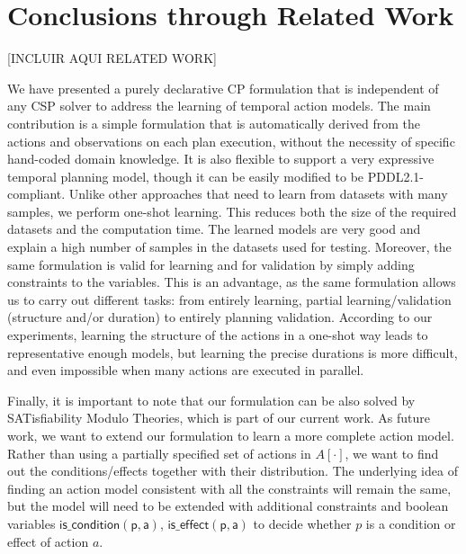 \documentclass[runningheads]{llncs}
\begin{document}
\section{Conclusions through Related Work}
\label{sec:conclusions}

[INCLUIR AQUI RELATED WORK]

We have presented a purely declarative CP formulation that is independent of any CSP solver to address the learning of temporal action models.
The main contribution is a simple formulation that is automatically derived from the actions and observations on each plan execution, without the necessity of specific hand-coded domain knowledge. It is also flexible to support a very expressive temporal planning model, though it can be easily modified to be PDDL2.1-compliant.
Unlike other approaches that need to learn from datasets with many samples, we perform one-shot learning. This reduces both the size of the required datasets and the computation time. The learned models are very good and explain a high number of samples in the datasets used for testing. Moreover, the same formulation is valid for learning and for validation by simply adding constraints to the variables. This is an advantage, as the same formulation allows us to carry out different tasks: from entirely learning, partial learning/validation (structure and/or duration) to entirely planning validation.
According to our experiments, learning the structure of the actions in a one-shot way leads to representative enough models, but learning the precise durations is more difficult, and even impossible when many actions are executed in parallel.


Finally, it is important to note that our formulation can be also solved by SATisfiability Modulo Theories, which is part of our current work. As future work, we want to extend our formulation to learn a more complete action model. Rather than using a partially specified set of actions in $A[\cdot]$, we want to find out the conditions/effects together with their distribution.
The underlying idea of finding an action model consistent with all the constraints will remain the same, but the model will need to be extended with additional constraints and boolean variables $\mathsf{is\_condition(p,a)}$, $\mathsf{is\_effect(p,a)}$ to decide whether $p$ is a condition or effect of action $a$.
\end{document}
